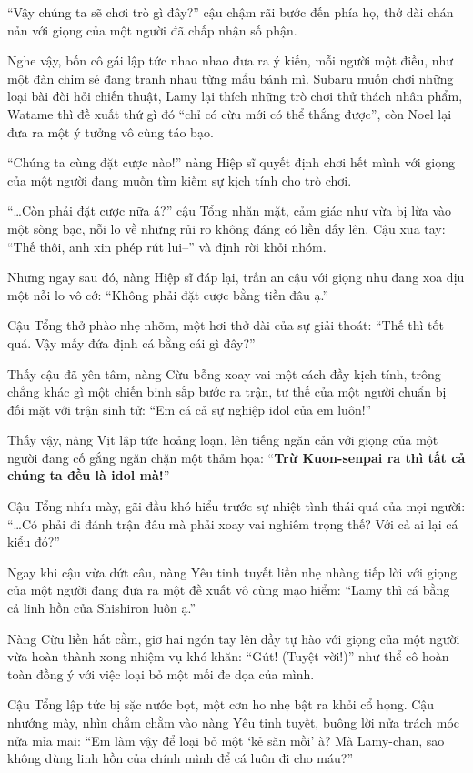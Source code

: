 \documentclass[../main.tex]{subfiles}
\begin{document}
\ct

``Vậy chúng ta sẽ chơi trò gì đây?'' cậu chậm rãi bước đến phía họ, thở dài chán nản với giọng của một người đã chấp nhận số phận.

Nghe vậy, bốn cô gái lập tức nhao nhao đưa ra ý kiến, mỗi người một điều, như một đàn chim sẻ đang tranh nhau từng mẩu bánh mì. Subaru muốn chơi những loại bài đòi hỏi chiến thuật, Lamy lại thích những trò chơi thử thách nhân phẩm, Watame thì đề xuất thứ gì đó ``chỉ có cừu mới có thể thắng được'', còn Noel lại đưa ra một ý tưởng vô cùng táo bạo.

``Chúng ta cùng đặt cược nào!'' nàng Hiệp sĩ quyết định chơi hết mình với giọng của một người đang muốn tìm kiếm sự kịch tính cho trò chơi.

``\dots Còn phải đặt cược nữa á?'' cậu Tổng nhăn mặt, cảm giác như vừa bị lừa vào một sòng bạc, nỗi lo về những rủi ro không đáng có liền dấy lên. Cậu xua tay: ``Thế thôi, anh xin phép rút lui--'' và định rời khỏi nhóm.

Nhưng ngay sau đó, nàng Hiệp sĩ đáp lại, trấn an cậu với giọng như đang xoa dịu một nỗi lo vô cớ: ``Không phải đặt cược bằng tiền đâu ạ.''

Cậu Tổng thở phào nhẹ nhõm, một hơi thở dài của sự giải thoát: ``Thế thì tốt quá. Vậy mấy đứa định cá bằng cái gì đây?''

Thấy cậu đã yên tâm, nàng Cừu bỗng xoay vai một cách đầy kịch tính, trông chẳng khác gì một chiến binh sắp bước ra trận, tư thế của một người chuẩn bị đối mặt với trận sinh tử: ``Em cá cả sự nghiệp idol của em luôn!''

Thấy vậy, nàng Vịt lập tức hoảng loạn, lên tiếng ngăn cản với giọng của một người đang cố gắng ngăn chặn một thảm họa: ``\textbf{Trừ Kuon-senpai ra thì tất cả chúng ta đều là idol mà!}''

Cậu Tổng nhíu mày, gãi đầu khó hiểu trước sự nhiệt tình thái quá của mọi người: ``\dots Có phải đi đánh trận đâu mà phải xoay vai nghiêm trọng thế? Với cả ai lại cá kiểu đó?''

Ngay khi cậu vừa dứt câu, nàng Yêu tinh tuyết liền nhẹ nhàng tiếp lời với giọng của một người đang đưa ra một đề xuất vô cùng mạo hiểm: ``Lamy thì cá bằng cả linh hồn của Shishiron luôn ạ.''

Nàng Cừu liền hất cằm, giơ hai ngón tay lên đầy tự hào với giọng của một người vừa hoàn thành xong nhiệm vụ khó khăn: ``Gút! (Tuyệt vời!)'' như thể cô hoàn toàn đồng ý với việc loại bỏ một mối đe dọa của mình.

Cậu Tổng lập tức bị sặc nước bọt, một cơn ho nhẹ bật ra khỏi cổ họng. Cậu nhướng mày, nhìn chằm chằm vào nàng Yêu tinh tuyết, buông lời nửa trách móc nửa mỉa mai: ``Em làm vậy để loại bỏ một `kẻ săn mồi' à? Mà Lamy-chan, sao không dùng linh hồn của chính mình để cá luôn đi cho máu?''
\end{document}
